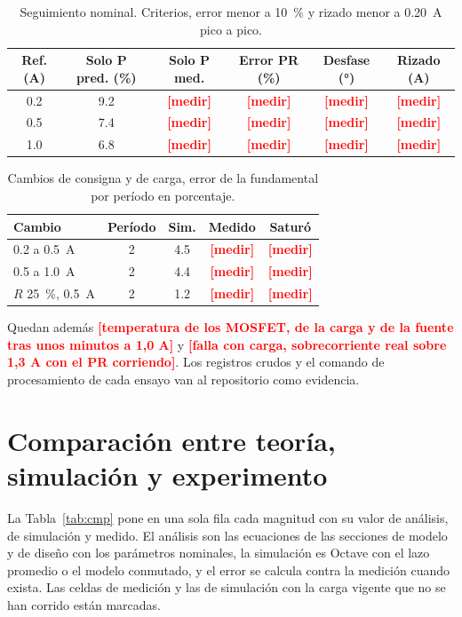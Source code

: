 \documentclass[journal]{IEEEtran}
\newcommand{\pendiente}[1]{\textcolor{red}{\textbf{[#1]}}}
\begin{document}
\begin{table}[!ht]
	\centering
	\caption{Seguimiento nominal. Criterios, error menor a \SI{10}{\percent} y rizado menor a \SI{0.20}{A} pico a pico.}
	\label{tab:med_nominal}
	\begin{tabular}{cccccc}
		\toprule
		Ref. (A) & Solo P pred. (\%) & Solo P med. & Error PR (\%) & Desfase (°) & Rizado (A) \\
		\midrule
		\num{0.2} & \num{9.2} & \pendiente{medir} & \pendiente{medir} & \pendiente{medir} & \pendiente{medir} \\
		\num{0.5} & \num{7.4} & \pendiente{medir} & \pendiente{medir} & \pendiente{medir} & \pendiente{medir} \\
		\num{1.0} & \num{6.8} & \pendiente{medir} & \pendiente{medir} & \pendiente{medir} & \pendiente{medir} \\
		\bottomrule
	\end{tabular}
\end{table}

\begin{table}[!ht]
	\centering
	\caption{Cambios de consigna y de carga, error de la fundamental por período en porcentaje.}
	\label{tab:med_cambios}
	\begin{tabular}{lcccc}
		\toprule
		Cambio & Período & Sim. & Medido & Saturó \\
		\midrule
		\num{0.2} a \SI{0.5}{A} & 2 & \num{4.5} & \pendiente{medir} & \pendiente{medir} \\
		\num{0.5} a \SI{1.0}{A} & 2 & \num{4.4} & \pendiente{medir} & \pendiente{medir} \\
		$R$ \SI{+25}{\percent}, \SI{0.5}{A} & 2 & \num{1.2} & \pendiente{medir} & \pendiente{medir} \\
		\bottomrule
	\end{tabular}
\end{table}

Quedan además \pendiente{temperatura de los MOSFET, de la carga y de la fuente tras unos minutos a 1,0 A} y \pendiente{falla con carga, sobrecorriente real sobre 1,3 A con el PR corriendo}. Los registros crudos y el comando de procesamiento de cada ensayo van al repositorio como evidencia.

\section{Comparación entre teoría, simulación y experimento}
\label{sec:comparacion}
La Tabla~\ref{tab:cmp} pone en una sola fila cada magnitud con su valor de análisis, de simulación y medido. El análisis son las ecuaciones de las secciones de modelo y de diseño con los parámetros nominales, la simulación es Octave con el lazo promedio o el modelo conmutado, y el error se calcula contra la medición cuando exista. Las celdas de medición y las de simulación con la carga vigente que no se han corrido están marcadas.
\end{document}
